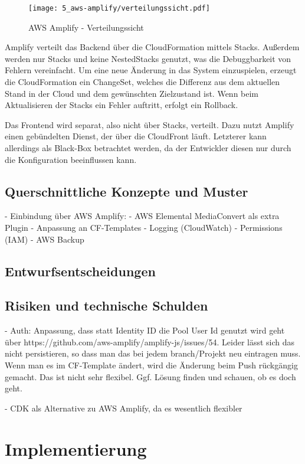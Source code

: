 \begin{figure}
  \centering
  \texttt{[image: 5\_aws-amplify/verteilungssicht.pdf]}
  \caption{AWS Amplify - Verteilungssicht}
  \label{Amplify:verteilungssicht}
\end{figure}

Amplify verteilt das Backend über die CloudFormation mittels Stacks. Außerdem werden nur Stacks und keine NestedStacks genutzt, was die Debuggbarkeit von Fehlern vereinfacht. Um eine neue Änderung in das System einzuspielen, erzeugt die CloudFormation ein ChangeSet, welches die Differenz aus dem aktuellen Stand in der Cloud und dem gewünschten Zielzustand ist. Wenn beim Aktualisieren der Stacks ein Fehler auftritt, erfolgt ein Rollback.

Das Frontend wird separat, also nicht über Stacks, verteilt. Dazu nutzt Amplify einen gebündelten Dienst, der über die CloudFront läuft. Letzterer kann allerdings als Black-Box betrachtet werden, da der Entwickler diesen nur durch die Konfiguration beeinflussen kann.

\subsection{Querschnittliche Konzepte und Muster}

- Einbindung über \ac{AWS} Amplify:
  - AWS Elemental MediaConvert als extra Plugin
  - Anpassung an CF-Templates
- Logging (CloudWatch)
- Permissions (IAM)
- AWS Backup

\subsection{Entwurfsentscheidungen}

\subsection{Risiken und technische Schulden}

- Auth: Anpassung, dass statt Identity ID die Pool User Id genutzt wird geht über https://github.com/aws-amplify/amplify-js/issues/54. Leider lässt sich das nicht persistieren, so dass man das bei jedem branch/Projekt neu eintragen muss. Wenn man es im CF-Template ändert, wird die Änderung beim Push rückgängig gemacht. Das ist nicht sehr flexibel. Ggf. Lösung finden und schauen, ob es doch geht.

- CDK als Alternative zu AWS Amplify, da es wesentlich flexibler

\section{Implementierung}